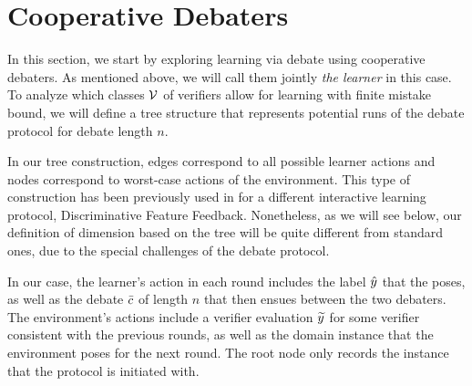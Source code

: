 \documentclass[11pt,letterpaper]{article}
\theoremstyle{definition}
\theoremstyle{plain}
\begin{document}
\section{Cooperative Debaters}
\label{sec:cooperative-case}
In this section, we start by exploring learning via debate using cooperative debaters. As mentioned above, we will call them jointly \emph{the learner} in this case. To analyze which classes $\V$ of verifiers allow for learning with finite mistake bound, we will define a tree structure that represents potential runs of the debate protocol for debate length $n$.

In our tree construction, edges correspond to all possible learner actions 
and nodes correspond to worst-case actions of the environment. 
This type of construction has been previously used in \cite{oz2026discriminative} for a different interactive learning protocol, Discriminative Feature Feedback. Nonetheless, as we will see below, our definition of dimension based on the tree will be quite different from standard ones, due to the special challenges of the debate protocol.

In our case, the learner's action in each round includes the label $\hy$ that the \dt poses, as well as the debate $\sc$ of length $n$ that then ensues between the two debaters.
The environment's actions include a verifier evaluation $\vy$ for some verifier consistent with the previous rounds, as well as the  domain instance that the environment poses for the next round.
The root node only records the instance that the protocol is initiated with.
\end{document}
